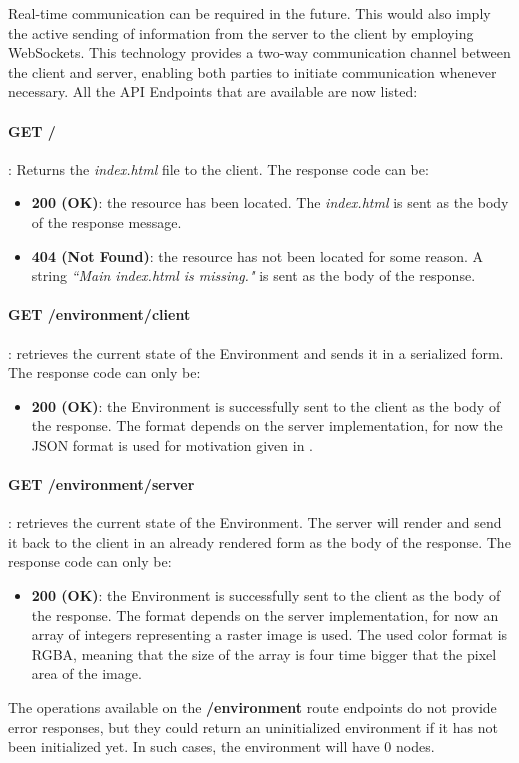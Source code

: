Real-time communication can be required in the future. This would also imply the active sending of information from the server to the client by employing WebSockets. This technology provides a two-way communication channel between the client and server, enabling both parties to initiate communication whenever necessary. All the API Endpoints that are available are now listed:
\paragraph{GET /}: Returns the \textit{index.html} file to the client. The response code can be:
\begin{itemize}
	\item \textbf{200 (OK)}: the resource has been located. The \textit{index.html} is sent as the body of the response message.
	\item \textbf{404 (Not Found)}: the resource has not been located for some reason. A string \textit{``Main index.html is missing."} is sent as the body of the response.
\end{itemize}
\paragraph{GET /environment/client}: retrieves the current state of the Environment and sends it in a serialized form. The response code can only be:
\begin{itemize}
	\item \textbf{200 (OK)}: the Environment is successfully sent to the client as the body of the response. The format depends on the server implementation, for now the JSON format is used for motivation given in .
\end{itemize}
\paragraph{GET /environment/server}: retrieves the current state of the Environment. The server will render and send it back to the client in an already rendered form as the body of the response. The response code can only be:
\begin{itemize}
	\item \textbf{200 (OK)}: the Environment is successfully sent to the client as the body of the response. The format depends on the server implementation, for now an array of integers representing a raster image is used. The used color format is RGBA, meaning that the size of the array is four time bigger that the pixel area of the image.
\end{itemize}
\begin{warn}
	The operations available on the \textbf{/environment} route endpoints do not provide error responses, but they could return an uninitialized environment if it has not been initialized yet. In such cases, the environment will have 0 nodes.
\end{warn}
